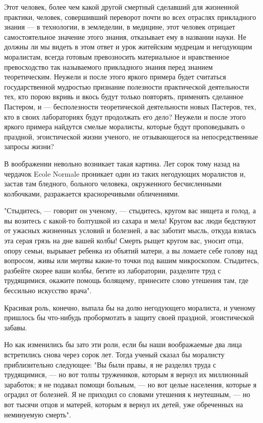 Этот человек, более  чем какой другой  смертный сделавший для  жизненной
практики,  человек,  совершивший  переворот   почти  во  всех   отраслях
прикладного знания  ---  в  технологии, в  земледелии,  в  медицине,  этот
человек отрицает самостоятельное значение этого знания, отказывает ему в
названии науки. Не  должны ли мы  видеть в этом  ответ и урок  житейским
мудрецам  и   негодующим   моралистам,   всегда   готовым   превозносить
материальное и  нравственное превосходство  так называемого  прикладного
знания перед знанием теоретическим. Неужели и после этого яркого примера
будет   считаться   государственной   мудростью   признание   полезности
практической деятельности тех,  кто порою  вкривь и  вкось будут  только
повторять, применять сделанное Пастером, и --- бесполезности теоретической
деятельности  новых  Пастеров,  тех,  кто  в  своих  лабораториях  будут
продолжать его  дело?  Неужели и  после  этого яркого  примера  найдутся
смелые моралисты, которые будут проповедывать о праздной,  эгоистической
жизни ученого, не отзывающегося на непосредственные запросы жизни?

В воображении невольно возникает такая картина. Лет сорок тому назад  на
чердачок Ecole Normale проникает один из таких негодующих моралистов  и,
застав  там  бледного,  больного  человека,  окруженного   бесчисленными
колбочками, разражается красноречивыми обличениями.

"Стыдитесь, ---  говорит он  ученому,  --- стыдитесь,  кругом вас  нищета  и
голод, а вы возитесь с какой-то  болтушкой из сахара и мела! Кругом  вас
люди бедствуют от ужасных  жизненных условий и  болезней, а вас  заботит
мысль, откуда взялась эта серая грязь  на дне вашей колбы! Смерть  рыщет
кругом вас,  уносит  отца,  опору семьи,  вырывает  ребенка  из  объятий
матери, а вы ломаете себе голову над вопросом, живы или мертвы  какие-то
точки под  вашим микроскопом.  Стыдитесь,  разбейте скорее  ваши  колбы,
бегите из  лаборатории, разделите  труд  с трудящимися,  окажите  помощь
болящему, принесите слово утешения там, где бессильно искусство врача".

Красивая роль,  конечно,  выпала бы  на  долю негодующего  моралиста,  и
ученому пришлось  бы что-нибудь  пробормотать в  защиту своей  праздной,
эгоистической забавы.

Но как изменились бы зато эти  роли, если бы наши воображаемые два  лица
встретились снова  через сорок  лет. Тогда  ученый сказал  бы  моралисту
приблизительно  следующее:  "Вы  были  правы,  я  не  разделял  труда  с
трудящимися, --- но вот толпы  тружеников, которым я вернул их  миллионный
заработок; я  не  подавал помощи  больным,  --- но  вот  целые  населения,
которые я  оградил от  болезней. Я  не приходил  со словами  утешения  к
неутешным, --- но вот тысячи отцов  и матерей, которым я вернул их  детей,
уже обреченных на неминуемую смерть".


